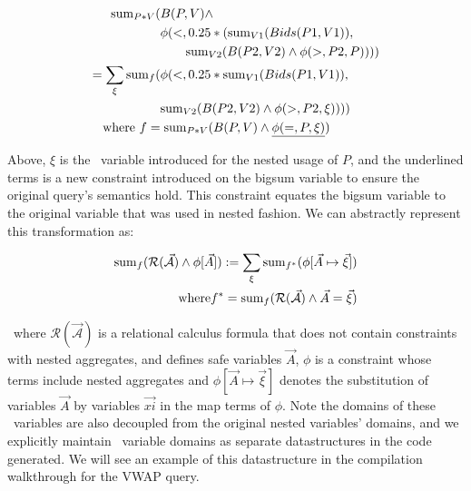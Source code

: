 \begin{align*}
  \mathrm{sum}_{P*V}( & B(P,V) \wedge \\
& \phi(<, 0.25*(\mathrm{sum}_{V1}(Bids(P1,V1)),
\\
& \qquad \mathrm{sum}_{V2}(B(P2,V2) \wedge \phi(>, P2, P)))) \\
= \sum_{\xi} \mathrm{sum}_{f}( & \phi(<, 0.25*\mathrm{sum}_{V1}(Bids(P1,V1)), \\
& \mathrm{sum}_{V2}(B(P2,V2) \wedge \phi(>, P2, \xi)))) \\
\mbox{ where } f = & \; \mathrm{sum}_{P*V}(B(P,V) \wedge \underline{\phi(=,P,\xi)})
\end{align*}

Above, $\xi$ is the \bigsum\ variable introduced for the nested usage of $P$,
and the underlined terms is a new constraint introduced on the bigsum variable
to ensure the original query's semantics hold. This constraint equates the
bigsum variable to the original variable that was used in nested fashion. We can
abstractly represent this transformation as:

\vspace{-3mm}
\begin{align*}
\mathrm{sum}_{f}(\mathcal{R(\vec{A})} \wedge \phi[\vec{A}]) :=
\sum_{\xi} \mathrm{sum}_{f^*}(\phi[\vec{A} \mapsto \vec{\xi}]) \\
 \mbox{ where} f^* = \mathrm{sum}_{f}(\mathcal{R(\vec{A})} \wedge \vec{A} = \vec{\xi})
\end{align*}

\vspace{-2mm}
\noindent~where $\mathcal{R(\vec{A})}$ is a relational calculus formula that
does not contain constraints with nested aggregates, and defines safe variables
$\vec{A}$, $\phi$ is a constraint whose terms include nested aggregates and
$\phi[\vec{A} \mapsto \vec{\xi}]$ denotes the substitution of variables
$\vec{A}$ by variables $\vec{xi}$ in the map terms of $\phi$.
Note the domains of these \bigsum\ variables are also decoupled from the
original nested variables' domains, and we explicitly maintain \bigsum\ variable
domains as separate datastructures in the code generated. We will see an example
of this datastructure in the compilation walkthrough for the VWAP query.


